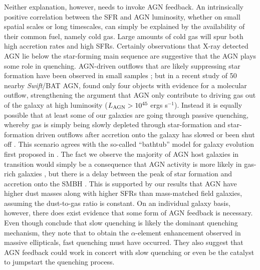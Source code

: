 \documentclass[fleqn, usenatbib]{mnras}
\newcommand{\swift}{\textit{Swift}}
\begin{document}
Neither explanation, however, needs to invoke AGN feedback. An intrinsically positive correlation between the SFR and AGN luminosity, whether on small spatial scales or long timescales, can simply be explained by the availability of their common fuel, namely cold gas. Large amounts of cold gas will spur both high accretion rates and high SFRs. Certainly observations that X-ray detected AGN lie below the star-forming main sequence \citep{Shimizu:2015xo, Matsuoka:2015fk, Mullaney:2015wn} are suggestive that the AGN plays some role in quenching. AGN-driven outflows that are likely suppressing star formation have been observed in small samples \citep{Veilleux:2013qq, Cicone:2014ty, Tombesi:2015fj}; but in a recent study of 50 nearby \swift/BAT AGN, \citet{Stone:2016zl} found only four objects with evidence for a molecular outflow, strengthening the argument that AGN only contribute to driving gas out of the galaxy at high luminosity ($L_{\rm AGN} > 10^{45}$ ergs s$^{-1}$). Instead it is equally possible that at least some of our galaxies are going through passive quenching, whereby gas is simply being slowly depleted through star-formation and star-formation driven outflows after accretion onto the galaxy has slowed or been shut off \citep{Peng:2015yg}. This scenario agrees with the so-called ``bathtub'' model for galaxy evolution first proposed in \citet{Lilly:2013pd}. The fact we observe the majority of AGN host galaxies in transition would simply be a consequence that AGN activity is more likely in gas-rich galaxies \citep{Vito:2014eu}, but there is a delay between the peak of star formation and accretion onto the SMBH \citep{Davies:2007kx, Schawinski:2014cr}. This is supported by our results that AGN have higher dust masses along with higher SFRs than mass-matched field galaxies, assuming the dust-to-gas ratio is constant. On an individual galaxy basis, however, there does exist evidence that some form of AGN feedback is necessary.  Even though \citep{Peng:2015yg} conclude that slow quenching is likely the dominant quenching mechanism, they note that to obtain the $\alpha$-element enhancement observed in massive ellipticals, fast quenching must have occurred. They also suggest that AGN feedback could work in concert with slow quenching or even be the catalyst to jumpstart the quenching process.
 
\end{document}
